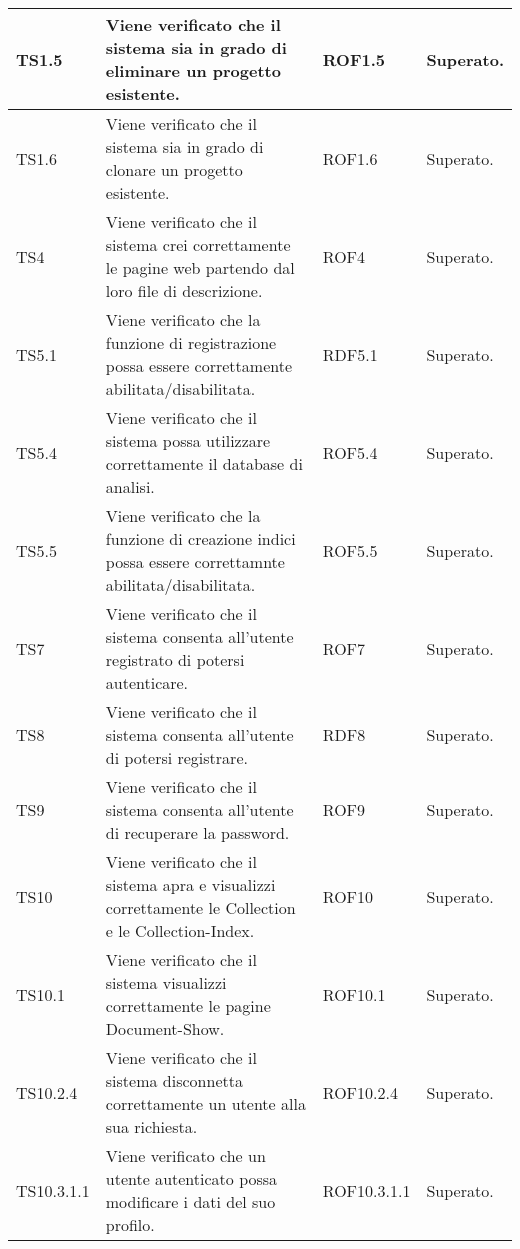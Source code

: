 \begin{center}
\begin{longtable}{|p{2cm}|p{7cm}|p{2cm}|p{2cm}|}
\midrule
TS1.5
& Viene verificato che il sistema sia in grado di eliminare un progetto esistente.
& ROF1.5
& Superato.\\


\midrule
TS1.6
& Viene verificato che il sistema sia in grado di clonare un progetto esistente.
& ROF1.6
& Superato.\\


\midrule
TS4
& Viene verificato che il sistema crei correttamente le pagine web partendo dal loro file di descrizione.
& ROF4
& Superato.\\


\midrule
TS5.1
& Viene verificato che la funzione di registrazione possa essere correttamente abilitata/disabilitata.
& RDF5.1
& Superato.\\


\midrule
TS5.4
& Viene verificato che il sistema possa utilizzare correttamente il database di analisi.
& ROF5.4
& Superato.\\


\midrule
TS5.5
& Viene verificato che la funzione di creazione indici possa essere correttamnte abilitata/disabilitata.
& ROF5.5
& Superato.\\


\midrule
TS7
& Viene verificato che il sistema consenta all'utente registrato di potersi autenticare.
& ROF7
& Superato.\\


\midrule
TS8
& Viene verificato che il sistema consenta all'utente di potersi registrare.
& RDF8
& Superato.\\


\midrule
TS9
& Viene verificato che il sistema consenta all'utente di recuperare la password.
& ROF9
& Superato.\\


\midrule
TS10
& Viene verificato che il sistema apra e visualizzi correttamente le Collection e le Collection-Index.
& ROF10
& Superato.\\


\midrule
TS10.1
& Viene verificato che il sistema visualizzi correttamente le pagine Document-Show.
& ROF10.1
& Superato.\\


\midrule
TS10.2.4
& Viene verificato che il sistema disconnetta correttamente un utente alla sua richiesta.
& ROF10.2.4
& Superato.\\


\midrule
TS10.3.1.1
& Viene verificato che un utente autenticato possa modificare i dati del suo profilo.
& ROF10.3.1.1
& Superato.\\



\end{longtable}
\end{center}
